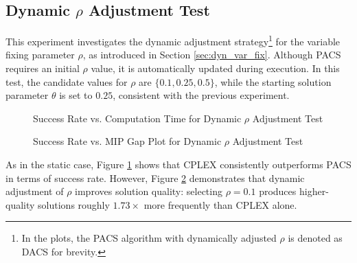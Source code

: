 \subsection{Dynamic $\rho$ Adjustment Test}\label{sec:test_dyn_rho}
This experiment investigates the dynamic adjustment strategy\footnote{In the plots, the PACS algorithm with dynamically adjusted $\rho$ is denoted as DACS for brevity.} for the variable fixing parameter $\rho$, as introduced in Section \ref{sec:dyn_var_fix}. Although PACS requires an initial $\rho$ value, it is automatically updated during execution. In this test, the candidate values for $\rho$ are $\{0.1, 0.25, 0.5\}$, while the starting solution parameter $\theta$ is set to $0.25$, consistent with the previous experiment.
\begin{figure}[H]
\centering
\begin{minipage}{0.6\columnwidth}
\centering
\resizebox{\linewidth}{!}{}
\end{minipage}%
\hfill
\begin{minipage}{0.4\columnwidth}
\centering
\resizebox{\linewidth}{!}{}
\end{minipage}
\caption{Success Rate vs. Computation Time for Dynamic $\rho$ Adjustment Test}
\label{fig:PACS_DYN_SuccRate}
\end{figure}

\begin{figure}[H]
\centering
\begin{minipage}{0.6\columnwidth}
\centering
\resizebox{\linewidth}{!}{}
\end{minipage}%
\hfill
\begin{minipage}{0.4\columnwidth}
\centering
\resizebox{\linewidth}{!}{}
\end{minipage}
\caption{Success Rate vs. MIP Gap Plot for Dynamic $\rho$ Adjustment Test}
\label{fig:PACS_DYN_MGAP}
\end{figure}

As in the static case, Figure \ref{fig:PACS_DYN_SuccRate} shows that CPLEX consistently outperforms PACS in terms of success rate. However, Figure \ref{fig:PACS_DYN_MGAP} demonstrates that dynamic adjustment of $\rho$ improves solution quality: selecting $\rho = 0.1$ produces higher-quality solutions roughly $1.73\times$ more frequently than CPLEX alone.

